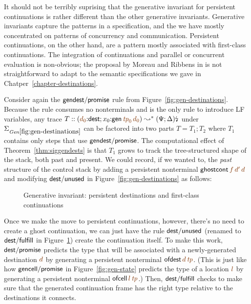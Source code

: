 It should not be terribly suprising that the generative invariant for
persistent continuations is rather different than the other generative
invariants. Generative invariants capture the patterns in a
specification, and the we have mostly concentrated on patterns of
concurrency and communication. Persistent continuations, on the other
hand, are a pattern mostly associated with first-class
continuations. The integration of continuations and parallel or
concurrent evaluation is non-obvious; the proposal by Moreau and
Ribbens in \cite{moreau96semantics} is not straightforward to adapt to
the semantic specifications we gave in
Chatper~\ref{chapter-destinations}.

Consider again the ${\sf gendest/promise}$ rule from
Figure~\ref{fig:gen-destinations}. Because the rule consumes no
nonterminals and is the only rule to introduce LF variables, any trace
$T :: \left(\lf{d_0}{:}{\sf dest}; x_0{:}{\sf gen}\,\lf{{\it
      tp}_0}\,\lf{d_0}\right) \leadsto^* \restrictsig{(\Psi;
  \Delta)}{}$ under $\siggendests$ can be factored into two parts $T =
T_1; T_2$ where $T_1$ contains only steps that use ${\sf
  gendest/promise}$. The computational effect of
Theorem~\ref{thm:siggendests} is that $T_1$ grows to track the
tree-structured shape of the stack, both past and present. We could
record, if we wanted to, the {\it past} structure of the control stack
by adding a persistent nonterminal ${\sf
  ghostcont}\,\lf{f}\,\lf{d'}\,\lf{d}$ and modifying ${\sf dest/unused}$
in Figure~\ref{fig:gen-destinations} as follows:

\smallskip
{}
\smallskip

\begin{figure}[tp]
\caption{Generative invariant: persistent destinations and first-class
  continuations}
\label{fig:gen-letcc2} 
\end{figure}

Once we make the move to persistent continuations, however, there's no
need to create a ghost continuation, we can just have the rule ${\sf
  dest/unused}$ (renamed to ${\sf dest/fulfill}$ in
Figure~\ref{fig:gen-letcc2}) create the continuation itself.  To make
this work, ${\sf dest/promise}$ predicts the type that will be
associated with a newly-generated destination $\lf{d}$ by generating a
persistent nonterminal ${\sf ofdest}\,\lf{d}\,\lf{{\it tp}}$. (This is
just like how ${\sf gencell/promise}$ in Figure~\ref{fig:gen-state}
predicts the type of a location $\lf{l}$ by generating a persistent
nonterminal ${\sf ofcell}\,\lf{l}\,\lf{{\it tp}}$.) Then, ${\sf
  dest/fulfill}$ checks to make sure that the generated continuation
frame has the right type relative to the destinations it connects.

